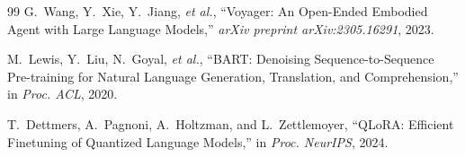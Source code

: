 \documentclass[conference]{IEEEtran}
\begin{document}
\begin{thebibliography}{99}
G.~Wang, Y.~Xie, Y.~Jiang, \emph{et al.},
``Voyager: An Open-Ended Embodied Agent with Large Language Models,''
\emph{arXiv preprint arXiv:2305.16291}, 2023.

M.~Lewis, Y.~Liu, N.~Goyal, \emph{et al.},
``BART: Denoising Sequence-to-Sequence Pre-training for Natural Language Generation, Translation, and Comprehension,''
in \emph{Proc. ACL}, 2020.

T.~Dettmers, A.~Pagnoni, A.~Holtzman, and L.~Zettlemoyer,
``QLoRA: Efficient Finetuning of Quantized Language Models,''
in \emph{Proc. NeurIPS}, 2024.

\end{thebibliography}
\end{document}
